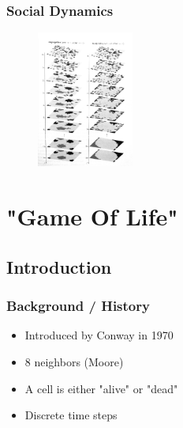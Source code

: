 \documentclass{beamer}
\begin{document}
\frame
{
  \frametitle{Social Dynamics}

  \begin{figure}
	\includegraphics[width = 120, align=right]{social}
\end{figure}
  

}

\section{"Game Of Life"}
\subsection{Introduction}
\frame
{
  \frametitle{Background / History}

  \begin{itemize}
  \item Introduced by Conway in 1970
  \item 8 neighbors (Moore)
  \item A cell is either "alive" or "dead"
  \item Discrete time steps
  \end{itemize}
}
\end{document}

